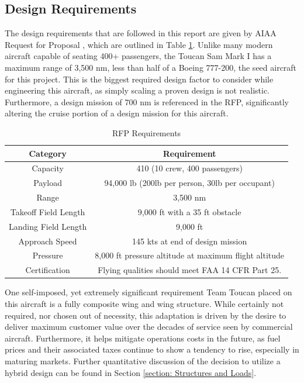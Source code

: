 \subsection{Design Requirements}
The design requirements that are followed in this report are given by AIAA Request for Proposal \cite{RFP}, which are outlined in Table \ref{uno}.  Unlike many modern aircraft capable of seating 400+ passengers, the Toucan Sam Mark I has a maximum range of 3,500 nm, less than half of a Boeing 777-200, the seed aircraft for this project.  This is the biggest required design factor to consider while engineering this aircraft, as simply scaling a proven design is not realistic.  Furthermore, a design mission of 700 nm is referenced in the RFP, significantly altering the cruise portion of a design mission for this aircraft.  

\begin{table}[h!] 
    \centering
    \caption{RFP Requirements}
    \begin{tabular}{ |c||c| }\toprule
    \textbf{Category} & \textbf{Requirement} \\\hline\hline
    Capacity & 410 (10 crew, 400 passengers) \\\hline
    Payload & 94,000 lb (200lb per person, 30lb per occupant) \\\hline
    Range & 3,500 nm \\\hline
    Takeoff Field Length & 9,000 ft with a 35 ft obstacle \\\hline
    Landing Field Length & 9,000 ft \\\hline
    Approach Speed & 145 kts at end of design mission\\\hline
    Pressure & 8,000 ft pressure altitude at maximum flight altitude \\\hline
    Certification & Flying qualities should meet FAA 14 CFR Part 25.\\\hline 

    \end{tabular}\label{uno}
\end{table}
\clearpage
One self-imposed, yet extremely significant requirement Team Toucan placed on this aircraft is a fully composite wing and wing structure. While certainly not required, nor chosen out of necessity, this adaptation is driven by the desire to deliver maximum customer value over the decades of service seen by commercial aircraft.  Furthermore, it helps mitigate operations costs in the future, as fuel prices and their associated taxes continue to show a tendency to rise, especially in maturing markets.  Further quantitative discussion of the decision to utilize a hybrid design can be found in Section \ref{section: Structures and Loads}.

